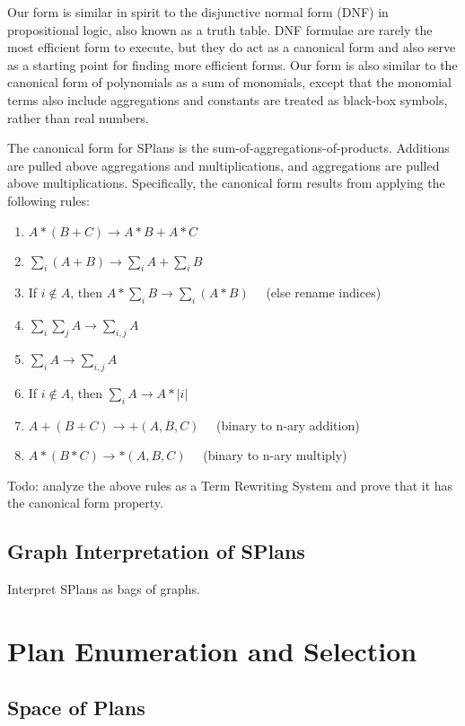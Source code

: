 Our form is similar in spirit to the disjunctive normal form (DNF) in propositional logic, also known as a truth table.  DNF formulae are rarely the most efficient form to execute, but they do act as a canonical form and also serve as a starting point for finding more efficient forms.  %
Our form is also similar to the canonical form of polynomials as a sum of monomials, except that the monomial terms also include aggregations and constants are treated as black-box symbols, rather than real numbers.

The canonical form for SPlans is the sum-of-aggregations-of-products.  Additions are pulled above aggregations and multiplications, and aggregations are pulled above multiplications.  Specifically, the canonical form results from applying the following rules:
\begin{enumerate}
  \item $A * (B + C) \rightarrow A*B + A*C$
  \item $\sum_i (A + B) \rightarrow \sum_i A + \sum_i B$
  \item If $i \not\in A$, then $A * \sum_i B \rightarrow \sum_i (A * B) \quad$ (else rename indices)
  \item $\sum_i \sum_j A \rightarrow \sum_{i,j} A$
  \item $\sum_i A \rightarrow \sum_{i,j} A$
  \item If $i \not\in A$, then $\sum_i A \rightarrow A * |i|$
  \item $A + (B + C) \rightarrow +(A, B, C) \quad$ (binary to n-ary addition)
  \item $A * (B * C) \rightarrow *(A, B, C) \quad$ (binary to n-ary multiply)
\end{enumerate}

Todo: analyze the above rules as a Term Rewriting System and prove that it has the canonical form property.


\subsection{Graph Interpretation of SPlans}
Interpret SPlans as bags of graphs.




\section{Plan Enumeration and Selection}



\subsection{Space of Plans}




